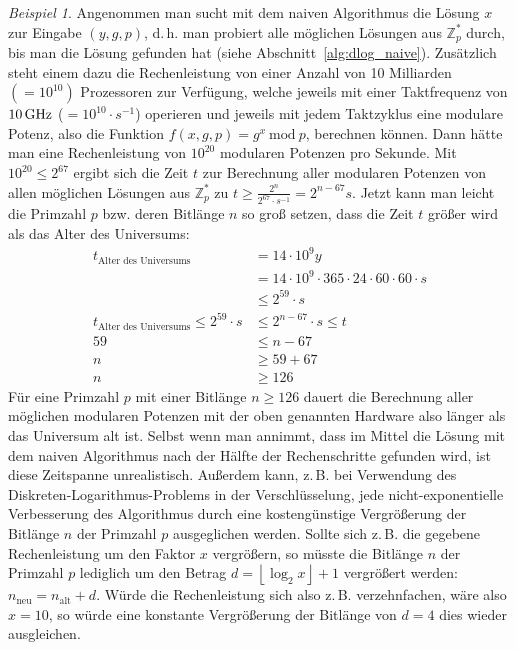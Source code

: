 \documentclass[
  a4paper,
  11pt,
]{scrartcl}
\theoremstyle{plain}
\theoremstyle{definition}
\theoremstyle{remark}
\newtheorem{beispiel}{Beispiel}
\newcommand{\Z}{\mathbb{Z}}
\newcommand{\Mod}[1]{\ \mathrm{mod}\ #1}
\begin{document}
\begin{beispiel}
  Angenommen man sucht mit dem naiven Algorithmus die Lösung $x$ zur Eingabe
  $(y, g, p)$, d.\,h. man probiert alle möglichen Lösungen aus $\Z_p^*$ durch,
  bis man die Lösung gefunden hat (siehe Abschnitt~\ref{alg:dlog_naive}).
  Zusätzlich steht einem dazu die Rechenleistung von einer Anzahl von 10
  Milliarden $(=10^{10})$ Prozessoren zur Verfügung, welche jeweils mit einer
  Taktfrequenz von $10 \text{\,GHz}$ ($= 10^{10} \cdot s^{-1}$) operieren und
  jeweils mit jedem Taktzyklus eine modulare Potenz, also die Funktion $f(x, g,
  p) = g^x \Mod{p}$, berechnen können.
  Dann hätte man eine Rechenleistung von $10^{20}$ modularen Potenzen pro
  Sekunde.
  Mit $10^{20} \leq 2^{67}$ ergibt sich die Zeit $t$ zur Berechnung aller
  modularen Potenzen von allen möglichen Lösungen aus $\Z_p^*$ zu
  $t \geq \frac{2^n}{2^{67}\cdot s^{-1}}=2^{n-67} s$.
  Jetzt kann man leicht die Primzahl $p$ bzw. deren Bitlänge $n$ so groß setzen,
  dass die Zeit $t$ größer wird als das Alter des Universums:
  \begin{align*}
    t_{\text{Alter des Universums}} & = 14 \cdot 10^9 y\\
    & = 14 \cdot 10^9 \cdot 365 \cdot 24 \cdot 60\cdot 60\cdot s\\
    & \leq 2^{59}\cdot s\\
    t_{\text{Alter des Universums}} \leq 2^{59}\cdot s & \leq 2^{n-67}\cdot s \leq t\\
    59 & \leq n-67\\
    n & \geq 59+67\\
    n & \geq 126
  \end{align*}
  Für eine Primzahl $p$ mit einer Bitlänge $n \geq 126$ dauert die Berechnung
  aller möglichen modularen Potenzen mit der oben genannten Hardware also länger
  als das Universum alt ist. Selbst wenn man annimmt, dass im Mittel die Lösung
  mit dem naiven Algorithmus nach der Hälfte der Rechenschritte gefunden wird,
  ist diese Zeitspanne unrealistisch. Außerdem kann, z.\,B. bei Verwendung des
  Diskreten-Logarithmus-Problems in der Verschlüsselung, jede
  nicht-exponentielle Verbesserung des Algorithmus durch eine kostengünstige
  Vergrößerung der Bitlänge $n$ der Primzahl $p$ ausgeglichen werden. Sollte
  sich z.\,B. die gegebene Rechenleistung um den Faktor $x$ vergrößern, so
  müsste die Bitlänge $n$ der Primzahl $p$ lediglich um den Betrag
  $d = \left\lfloor \log_2 x \right\rfloor + 1$ vergrößert werden:
  $n_{\text{neu}} = n_{\text{alt}} + d$. Würde die Rechenleistung sich also
  z.\,B. verzehnfachen, wäre also $x=10$, so würde eine konstante Vergrößerung
  der Bitlänge von $d=4$ dies wieder ausgleichen.
\end{beispiel}
\end{document}
